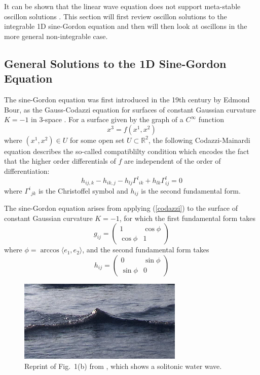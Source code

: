 \documentclass{report}
\begin{document}
It can be shown that the linear wave equation does not support meta-stable oscillon solutions \cite{Copeland:1995fq}. This section will first review oscillon solutions to the integrable 1D sine-Gordon equation and then will then look at oscillons in the more general non-integrable case.

\subsection{General Solutions to the 1D Sine-Gordon Equation}

The sine-Gordon equation was first introduced in the 19th century by Edmond Bour, as the Gauss-Codazzi equation for surfaces of constant Gaussian curvature $K=-1$ in 3-space \cite{bour}. For a surface given by the graph of a $C^\infty$ function
\begin{equation}
  x^3 = f(x^1, x^2)
\end{equation}
where $(x^1,x^2)\in U$ for some open set $U\subset \mathbb{R}^2$, the following Codazzi-Mainardi equation describes the so-called compatiblilty condition which encodes the fact that the higher order differentials of $f$ are independent of the order of differentiation:
\begin{equation}\label{codazzi}
  h_{ij,k} - h_{ik,j} - h_{lj}\Gamma ^l{}_{ik} + h_{lk}\Gamma^l_{ij}=0
\end{equation}
where $\Gamma^i{}_{jk}$ is the Christoffel symbol and $h_{ij}$ is the second fundamental form.

The sine-Gordon equation arises from applying (\ref{codazzi}) to the surface of constant Gaussian curvature $K=-1$, for which the first fundamental form takes
\begin{equation}
  g_{ij} = \left( \begin{array}{cc}
    1& \cos\phi\\
    \cos\phi&1
    \end{array}\right)
\end{equation}
where $\phi = \arccos \langle e_1,e_2\rangle$, and the second fundamental form takes
\begin{equation}
  h_{ij} = \left( \begin{array}{cc}
    0& \sin\phi\\
    \sin\phi&0
    \end{array}\right)
\end{equation}

\begin{figure}\centering
  \includegraphics[width=0.7\textwidth]{plot/water-soliton.png}
  \caption{Reprint of Fig.~1(b) from \cite{PhysRevE.86.036305}, which shows a solitonic water wave.}
  \label{water}
\end{figure}
\end{document}
